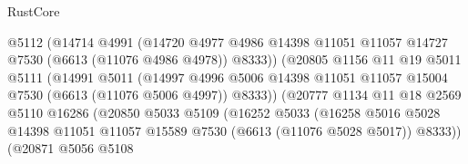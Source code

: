 \begin{lexlean}{RustCore}
\begin{coremodule}
                                  @5112
                                  (@14714
                                    @4991
                                    (@14720
                                      @4977
                                      @4986
                                      @14398
                                      @11051
                                      @11057
                                      @14727
                                      @7530
                                      (@6613 (@11076 @4986 @4978))
                                      @8333))
                                  (@20805
                                    @1156
                                    @11
                                    @19
                                    @5011
                                    @5111
                                    (@14991
                                      @5011
                                      (@14997
                                        @4996
                                        @5006
                                        @14398
                                        @11051
                                        @11057
                                        @15004
                                        @7530
                                        (@6613 (@11076 @5006 @4997))
                                        @8333))
                                    (@20777
                                      @1134
                                      @11
                                      @18
                                      @2569
                                      @5110
                                      @16286
                                      (@20850
                                        @5033
                                        @5109
                                        (@16252
                                          @5033
                                          (@16258
                                            @5016
                                            @5028
                                            @14398
                                            @11051
                                            @11057
                                            @15589
                                            @7530
                                            (@6613 (@11076 @5028 @5017))
                                            @8333))
                                        (@20871
                                          @5056
                                          @5108

\end{coremodule}
\end{lexlean}
